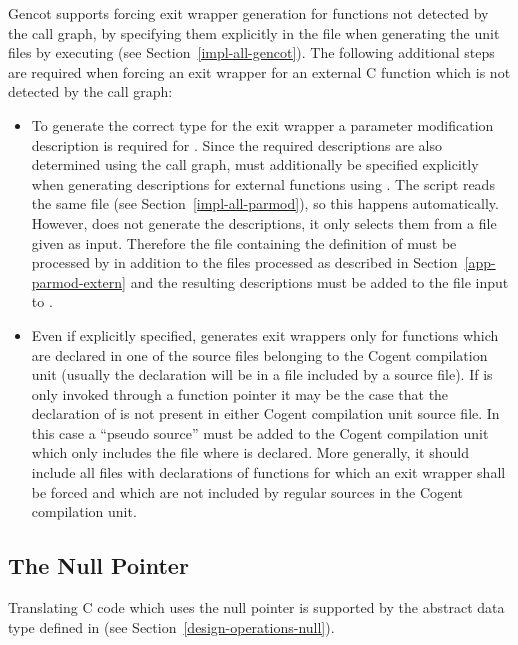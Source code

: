Gencot supports forcing exit wrapper generation for functions not detected by the call graph, by specifying them
explicitly in the file  when generating the unit files by executing 
(see Section~\ref{impl-all-gencot}). The following additional steps are
required when forcing an exit wrapper for an external C function  which is not detected by the call graph:
\begin{itemize}
\item To generate the correct type for the exit wrapper a parameter modification description is required for 
. Since the required descriptions are also determined using the call graph,  must additionally
be specified explicitly when generating descriptions for external functions using . The
 script reads the same file  (see Section~\ref{impl-all-parmod}),
so this happens automatically. However,  does not generate the descriptions, it only selects 
them from a file given as input. Therefore the file containing the definition of  must be processed 
by  in addition to the files processed as described in Section~\ref{app-parmod-extern} and the 
resulting descriptions must be added to the file input to .
\item Even if explicitly specified,  generates exit wrappers only for functions which are declared
in one of the source files belonging to the Cogent compilation unit (usually the declaration will be in a 
file included by a source file). If  is only invoked through a function pointer it may be the case that
the declaration of  is not present in either Cogent compilation unit source file. In this case a ``pseudo
source'' must be added to the Cogent compilation unit which only includes the  file where 
is declared. More generally, it should include all  files with declarations of functions for which an
exit wrapper shall be forced and which are not included by regular sources in the Cogent compilation unit.
\end{itemize}

\subsection{The Null Pointer}
\label{app-transfunction-null}

Translating C code which uses the null pointer is supported by the abstract data type  defined
in  (see Section~\ref{design-operations-null}).

